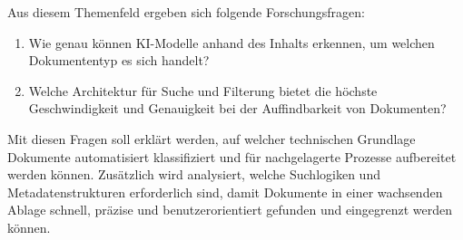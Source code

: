 Aus diesem Themenfeld ergeben sich folgende Forschungsfragen:
\begin{enumerate}
    \item Wie genau können KI-Modelle anhand des Inhalts erkennen, um welchen Dokumententyp es sich handelt?
    \item Welche Architektur für Suche und Filterung bietet die höchste Geschwindigkeit und Genauigkeit bei der Auffindbarkeit von Dokumenten?
\end{enumerate}

Mit diesen Fragen soll erklärt werden, auf welcher technischen Grundlage Dokumente automatisiert klassifiziert und für nachgelagerte Prozesse aufbereitet werden können. Zusätzlich wird analysiert, welche Suchlogiken und Metadatenstrukturen erforderlich sind, damit Dokumente in einer wachsenden Ablage schnell, präzise und benutzerorientiert gefunden und eingegrenzt werden können.
